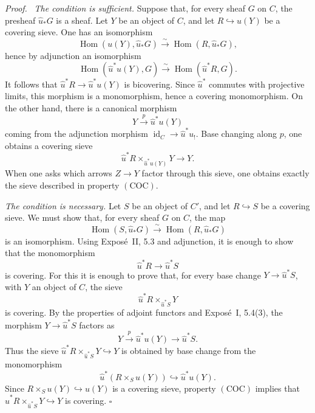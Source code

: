\documentclass[11pt]{article}
\newcommand{\Hom}{\operatorname{Hom}}
\newcommand{\id}{\operatorname{id}}
\newcommand{\qedtext}{\hfill\(\square\)}
\newenvironment{prooftext}{\par\noindent\emph{Proof.}\ }{\par\medskip}
\begin{document}
\begin{prooftext}
\emph{The condition is sufficient.} Suppose that, for every sheaf \(G\) on \(C\), the presheaf \(\widehat u_*G\) is a sheaf. Let \(Y\) be an object of \(C\), and let \(R\hookrightarrow u(Y)\) be a covering sieve. One has an isomorphism
\[
\Hom(u(Y),\widehat u_*G)\xrightarrow{\sim}\Hom(R,\widehat u_*G),
\]
hence by adjunction an isomorphism
\[
\Hom(\widehat u^*u(Y),G)\xrightarrow{\sim}\Hom(\widehat u^*R,G).
\]
It follows that \(\widehat u^*R\to\widehat u^*u(Y)\) is bicov\-ering. Since \(\widehat u^*\) commutes with projective limits, this morphism is a monomorphism, hence a covering monomorphism. On the other hand, there is a canonical morphism
\[
Y\xrightarrow{p}\widehat u^*u(Y)
\]
coming from the adjunction morphism \(\id_C\to\widehat u^*u_!\). Base changing along \(p\), one obtains a covering sieve
\[
\widehat u^*R\times_{\widehat u^*u(Y)}Y\longrightarrow Y.
\]
When one asks which arrows \(Z\to Y\) factor through this sieve, one obtains exactly the sieve described in property \((\mathrm{COC})\).

\emph{The condition is necessary.} Let \(S\) be an object of \(C'\), and let \(R\hookrightarrow S\) be a covering sieve. We must show that, for every sheaf \(G\) on \(C\), the map
\[
\Hom(S,\widehat u_*G)\xrightarrow{\sim}\Hom(R,\widehat u_*G)
\]
is an isomorphism. Using Expos\'e~II, 5.3 and adjunction, it is enough to show that the monomorphism
\[
\widehat u^*R\to\widehat u^*S
\]
is covering. For this it is enough to prove that, for every base change \(Y\to\widehat u^*S\), with \(Y\) an object of \(C\), the sieve
\[
\widehat u^*R\times_{\widehat u^*S}Y
\]
is covering. By the properties of adjoint functors and Expos\'e~I, 5.4(3), the morphism \(Y\to\widehat u^*S\) factors as
\[
Y\xrightarrow{p}\widehat u^*u(Y)\to\widehat u^*S.
\]
Thus the sieve \(\widehat u^*R\times_{\widehat u^*S}Y\hookrightarrow Y\) is obtained by base change from the monomorphism
\[
\widehat u^*(R\times_Su(Y))\hookrightarrow\widehat u^*u(Y).
\]
Since \(R\times_Su(Y)\hookrightarrow u(Y)\) is a covering sieve, property \((\mathrm{COC})\) implies that \(\widehat u^*R\times_{\widehat u^*S}Y\hookrightarrow Y\) is covering. \qedtext
\end{prooftext}
\end{document}

